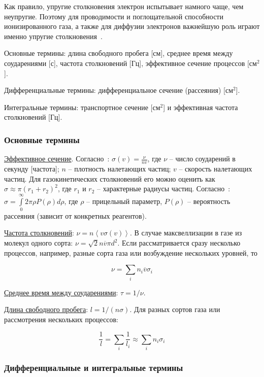 \documentclass[10pt, a4paper]{article}
\begin{document}
Как правило, упругие столкновения электрон испытывает намного чаще, чем неупругие. Поэтому для проводимости и поглощательной способности ионизированного газа, а также для диффузии электронов важнейшую роль играют именно упругие столкновения~\cite{raizer}.

Основные термины: длина свободного пробега [см], среднее время между соударениями [с], частота столкновений [Гц], эффективное сечение процессов [см$^2$]. 

Дифференциальные термины: дифференциальное сечение (рассеяния) [см$^2$].

Интегральные термины: транспортное сечение [см$^2$] и эффективная частота столкновений [Гц].

\subsubsection{Основные термины}

\uline{Эффективное сечение}. Согласно~\cite{raizer}: $\sigma(v) = \frac{\nu}{nv}$, где $\nu$ -- число соударений в секунду [частота]; $n$ -- плотность налетающих частиц; $v$ -- скорость налетающих частиц. Для газокинетических столкновений его можно оценить как $\sigma \approx \pi(r_1+r_2)^2$, где $r_1$ и $r_2$ -- характерные радиусы частиц. Согласно~\cite{astap}: $\sigma=\int\limits_{0}^{\infty} 2\pi \rho P(\rho) d\rho$, где $\rho$ -- прицельный параметр, $P(\rho)$ -- вероятность рассеяния (зависит от конкретных реагентов). 

\uline{Частота столкновений}: $\nu = n\left\langle v\sigma(v)\right\rangle $. В случае максвеллизации в газе из молекул одного сорта: $\nu = \sqrt{2}n\overline{v}\pi d^2$. 
Если рассматривается сразу несколько процессов, например, разные сорта газа или возбуждение нескольких уровней, то

\begin{equation*}
	\nu = \sum_{i}n_i\overline{v}\sigma_i
\end{equation*}

\uline{Среднее время между соударениями}: $\tau = 1/\nu$.

\uline{Длина свободного пробега}: $l = 1/(n\sigma)$.
Для разных сортов газа или рассмотрения нескольких процессов:

\begin{equation*}
	\frac{1}{l} = \sum_{i}\frac{1}{l_i}\approx\sum_{i}n_i\sigma_i
\end{equation*}

\subsubsection{Дифференциальные и интегральные термины}
\end{document}
